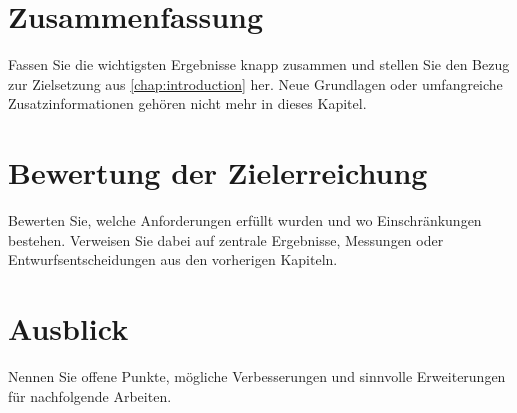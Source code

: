 
\section{Zusammenfassung}

Fassen Sie die wichtigsten Ergebnisse knapp zusammen und stellen Sie den Bezug
zur Zielsetzung aus \cref{chap:introduction} her. Neue Grundlagen oder
umfangreiche Zusatzinformationen gehören nicht mehr in dieses Kapitel.

\section{Bewertung der Zielerreichung}

Bewerten Sie, welche Anforderungen erfüllt wurden und wo Einschränkungen
bestehen. Verweisen Sie dabei auf zentrale Ergebnisse, Messungen oder
Entwurfsentscheidungen aus den vorherigen Kapiteln.

\section{Ausblick}

Nennen Sie offene Punkte, mögliche Verbesserungen und sinnvolle Erweiterungen
für nachfolgende Arbeiten.
